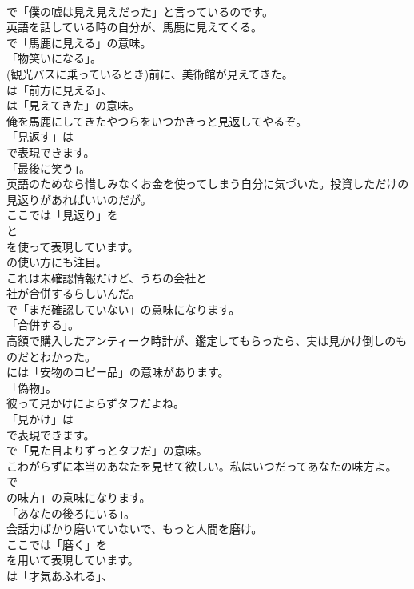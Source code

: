 \documentclass[8pt]{extreport}
\begin{document}
\begin{CJK}{UTF8}{min}
\\	で「僕の嘘は見え見えだった」と言っているのです。	
\\	英語を話している時の自分が、馬鹿に見えてくる。 
\\	で「馬鹿に見える」の意味。
\\	「物笑いになる」。	
\\	(観光バスに乗っているとき)前に、美術館が見えてきた。 
\\	は「前方に見える」、
\\	は「見えてきた」の意味。	
\\	俺を馬鹿にしてきたやつらをいつかきっと見返してやるぞ。 
\\	「見返す」は
\\	で表現できます。
\\	「最後に笑う」。	
\\	英語のためなら惜しみなくお金を使ってしまう自分に気づいた。投資しただけの見返りがあればいいのだが。 
\\	ここでは「見返り」を 
\\	と 
\\	を使って表現しています。
\\	の使い方にも注目。	
\\	これは未確認情報だけど、うちの会社と
\\	社が合併するらしいんだ。 
\\	で「まだ確認していない」の意味になります。
\\	「合併する」。	
\\	高額で購入したアンティーク時計が、鑑定してもらったら、実は見かけ倒しのものだとわかった。 
\\	には「安物のコピー品」の意味があります。
\\	「偽物」。	
\\	彼って見かけによらずタフだよね。 
\\	「見かけ」は
\\	で表現できます。
\\	で「見た目よりずっとタフだ」の意味。	
\\	こわがらずに本当のあなたを見せて欲しい。私はいつだってあなたの味方よ。 
\\	で
\\	の味方」の意味になります。
\\	「あなたの後ろにいる」。	
\\	会話力ばかり磨いていないで、もっと人間を磨け。 
\\	ここでは「磨く」を 
\\	を用いて表現しています。
\\	は「才気あふれる」、

\end{CJK}
\end{document}
